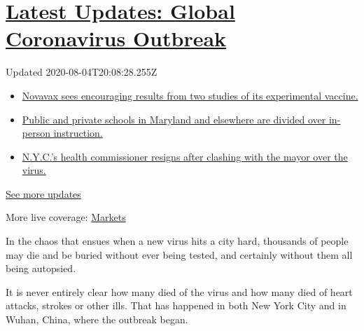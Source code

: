 \hypertarget{latest-updates-global-coronavirus-outbreak}{%
\section{\texorpdfstring{\href{https://www.nytimes.com/2020/08/04/world/coronavirus-cases.html?action=click\&pgtype=Article\&state=default\&region=MAIN_CONTENT_1\&context=storylines_live_updates}{Latest
Updates: Global Coronavirus
Outbreak}}{Latest Updates: Global Coronavirus Outbreak}}\label{latest-updates-global-coronavirus-outbreak}}

Updated 2020-08-04T20:08:28.255Z

\begin{itemize}
\tightlist
\item
  \href{https://www.nytimes.com/2020/08/04/world/coronavirus-cases.html?action=click\&pgtype=Article\&state=default\&region=MAIN_CONTENT_1\&context=storylines_live_updates\#link-1228a480}{Novavax
  sees encouraging results from two studies of its experimental
  vaccine.}
\item
  \href{https://www.nytimes.com/2020/08/04/world/coronavirus-cases.html?action=click\&pgtype=Article\&state=default\&region=MAIN_CONTENT_1\&context=storylines_live_updates\#link-4825b93}{Public
  and private schools in Maryland and elsewhere are divided over
  in-person instruction.}
\item
  \href{https://www.nytimes.com/2020/08/04/world/coronavirus-cases.html?action=click\&pgtype=Article\&state=default\&region=MAIN_CONTENT_1\&context=storylines_live_updates\#link-4d1eafa8}{N.Y.C.'s
  health commissioner resigns after clashing with the mayor over the
  virus.}
\end{itemize}

\href{https://www.nytimes.com/2020/08/04/world/coronavirus-cases.html?action=click\&pgtype=Article\&state=default\&region=MAIN_CONTENT_1\&context=storylines_live_updates}{See
more updates}

More live coverage:
\href{https://www.nytimes.com/live/2020/08/04/business/stock-market-today-coronavirus?action=click\&pgtype=Article\&state=default\&region=MAIN_CONTENT_1\&context=storylines_live_updates}{Markets}

In the chaos that ensues when a new virus hits a city hard, thousands of
people may die and be buried without ever being tested, and certainly
without them all being autopsied.

It is never entirely clear how many died of the virus and how many died
of heart attacks, strokes or other ills. That has happened in both New
York City and in Wuhan, China, where the outbreak began.

